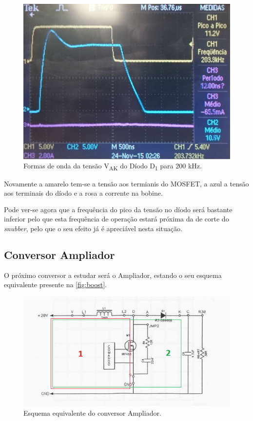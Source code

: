 \documentclass[a4paper,11pt]{article}
\numberwithin{equation}{section}
\begin{document}
\begin{figure}[H]
	\centering
	\includegraphics[keepaspectratio=true, scale=0.15]{img/figs/vak_hf_buck}
	\caption{Formas de onda da tensão V\textsubscript{AK} do Díodo D\textsubscript{1} para $200$ kHz.}
	\label{fig:vak_hf_buck}
	\vspace{-0.8em}
\end{figure}

Novamente a amarelo tem-se a tensão aos termianis do MOSFET, a azul a tensão aos terminais do díodo e a rosa a corrente na bobine.

Pode ver-se agora que a frequência do pico da tensão no díodo será bastante inferior pelo que esta frequência de operação estará próxima da de corte do \textit{snubber}, pelo que o seu efeito já é apreciável nesta situação.

\subsection{Conversor Ampliador}

O próximo conversor a estudar será o Ampliador, estando o seu esquema equivalente presente na \autoref{fig:boost}.

\begin{figure}[H]
	\centering
	\includegraphics[keepaspectratio=true, scale=1]{teoricas/boost}
	\caption{Esquema equivalente do conversor Ampliador.}
	\label{fig:boost}
	\vspace{-0.8em}
\end{figure}
\end{document}
